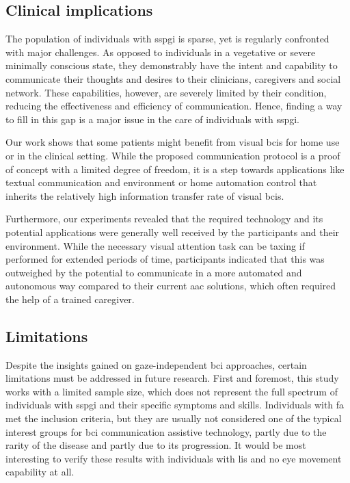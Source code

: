 \documentclass[twocolumn]{article}
\begin{document}
\subsection{Clinical implications}
The population of individuals with \ac{sspgi} is sparse, yet is regularly
confronted with major challenges.
As opposed to individuals in a vegetative or severe minimally conscious state,
they demonstrably have the intent and capability to communicate their thoughts
and desires to their clinicians, caregivers and social network.
These capabilities, however, are severely limited by their condition,
reducing the effectiveness and efficiency of communication.
Hence, finding a way to fill in this gap is a major issue in the care of
individuals with \ac{sspgi}.

Our work shows that some patients might benefit from visual \acp{bci}
for home use or in the clinical setting.
While the proposed communication protocol is a proof of concept with a limited degree
of freedom, it is a step towards applications like textual communication and
environment or home automation control that inherits the relatively high
information transfer rate of visual \acp{bci}.

Furthermore, our experiments revealed that the required technology and its
potential applications were generally well received by the participants and their
environment.
While the necessary visual attention task can be taxing if performed for
extended
periods of time, participants indicated that this was outweighed by the
potential to communicate in a more automated and autonomous way compared to
their current \ac{aac} solutions, which often required the help of a trained caregiver.

\subsection{Limitations}

Despite the insights gained on gaze-independent \ac{bci} approaches, certain limitations must be addressed in future research.
First and foremost, this study works with a limited sample size, which
does not represent the full spectrum of individuals with
\ac{sspgi} and their specific symptoms and skills.
Individuals with \ac{fa} met the inclusion criteria, but they are usually not
considered one of the typical interest groups for \ac{bci} communication assistive
technology, partly due to the rarity of the disease and partly due to its
progression.
It would be most interesting to verify these results with individuals with
\ac{lis} and no eye movement capability at all.
\end{document}
